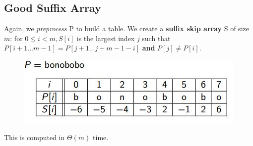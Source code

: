 \documentclass{report}
\begin{document}
\subsection{Good Suffix Array}
Again, we \textit{preprocess} P to build a table. We create a \textbf{suffix skip array} S of size $m$: for $0 \leq i < m, S[i]$ is the largest index $j$ such that $P[i+1 ... m-1] = P[j+1 ... j + m - 1 - i]$ \textbf{and} $P[j] \neq P[i]$.
\begin{figure}[ht]
\begin{center}
\includegraphics[scale=0.8]{suffix.jpg}
\end{center}
\end{figure}
This is computed in $\Theta(m)$ time.
\end{document}
